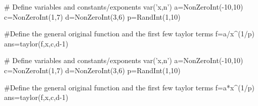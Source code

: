 

\begin{sagesilent}
# Define variables and constants/exponents
var('x,n')
a=NonZeroInt(-10,10)
c=NonZeroInt(1,7)
d=NonZeroInt(3,6)
p=RandInt(1,10)

#Define the general original function and the first few taylor terms
f=a/x^(1/p)
ans=taylor(f,x,c,d-1)
\end{sagesilent}


\begin{sagesilent}
# Define variables and constants/exponents
var('x,n')
a=NonZeroInt(-10,10)
c=NonZeroInt(1,7)
d=NonZeroInt(3,6)
p=RandInt(1,10)

#Define the general original function and the first few taylor terms
f=a*x^(1/p)
ans=taylor(f,x,c,d-1)
\end{sagesilent}




